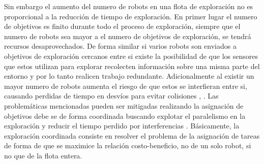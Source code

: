 Sin embargo el aumento del numero de robots en una flota de exploración no es proporcional a la reducción de tiempo de exploración. En primer lugar el numero de objetivos es finito durante todo el proceso de exploración, siempre que el numero de robots sea mayor a el numero de objetivos de exploración, se tendrá recursos desaprovechados. De forma similar si varios robots son enviados a objetivos de exploración cercanos entre si existe la posibilidad de que los sensores que estos utilizan para explorar recolecten información sobre una misma parte del entorno y por lo tanto realicen trabajo redundante. Adicionalmente al existir un mayor numero de robots aumenta el riesgo de que estos se interfieran entre si, causando perdidas de tiempo en desvíos para evitar colisiones \cite{guzzoni1997many}, \cite{goldberg1997interference}. %
Las problemáticas mencionadas pueden ser mitigadas realizando la asignación de objetivos debe se de forma coordinada buscando explotar el paralelismo en la exploración y reducir el tiempo perdido por interferencias \cite{nieto2014coordination}. Básicamente, la exploración coordinada consiste en resolver el problema de la asignación de tareas de forma de que se maximice la relación costo-beneficio, no de un solo robot, si no que de la flota entera.









  


